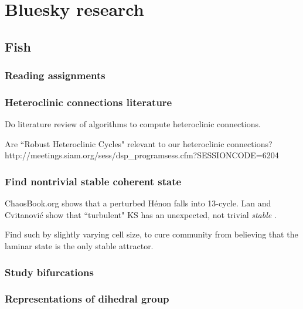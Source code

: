 
\chapter{Bluesky research}
\label{bluesky}

\section{Fish}

\subsection{Reading assignments}

\subsection{Heteroclinic connections literature}

Do literature review of algorithms to
compute heteroclinic connections.

Are ``Robust Heteroclinic Cycles" relevant to our heteroclinic connections?
\\
http://meetings.siam.org/sess/dsp\_programsess.cfm?SESSIONCODE=6204

\subsection{Find nontrivial stable coherent state}

ChaosBook.org shows that a perturbed H\'enon falls into 13-cycle.
Lan and Cvitanovi{\'c} show that ``turbulent" KS has an
unexpected, not trivial {\em stable} \eqv.

Find such by slightly varying cell size,
to cure community from believing that
the laminar state is the only stable attractor.

\subsection{Study bifurcations}

\subsection{Representations of dihedral group}

